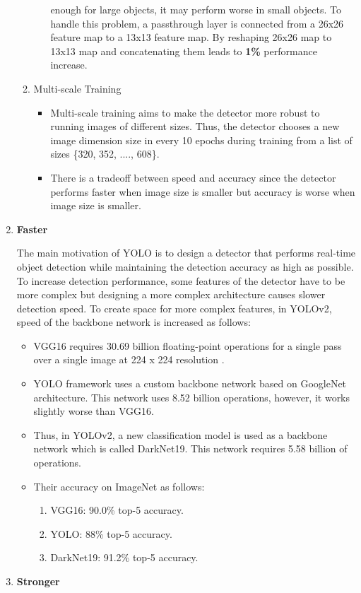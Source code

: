 \documentclass{article}
\begin{document}
\begin{enumerate}
\begin{enumerate}
\begin{itemize}
        enough for large objects, it may perform worse in small objects. To handle this problem, 
        a passthrough layer is connected from a 26x26 feature map to a 13x13 feature map. 
        By reshaping 26x26 map to 13x13 map and concatenating them leads to \textbf{1\%} performance increase. 
        \end{itemize}
        \item Multi-scale Training
        \begin{itemize}
            \item Multi-scale training aims to make the detector more robust 
            to running images of different sizes. Thus, the detector chooses a new 
            image dimension size in every 10 epochs during training from a list of 
            sizes \{320, 352, ...., 608\}.
            \item There is a tradeoff between speed and accuracy since the detector 
            performs faster when image size is smaller but accuracy is worse when 
            image size is smaller.
        \end{itemize}
    \end{enumerate}
    \item \textbf{Faster}

    The main motivation of YOLO is to design a detector that performs 
    real-time object detection while maintaining the detection accuracy as high 
    as possible. To increase detection performance, some features of the detector 
    have to be more complex but designing a more complex architecture causes 
    slower detection speed. To create space for more complex features, in 
    YOLOv2, speed of the backbone network is increased as follows:
    \begin{itemize}
        \item VGG16 requires 30.69 billion floating-point operations for a single 
        pass over a single image at 224 x 224 resolution \cite{yolo9000cite}.
        \item YOLO framework uses a custom backbone network based on GoogleNet 
        architecture. This network uses 8.52 billion operations, however, it works 
        slightly worse than VGG16.
        \item Thus, in YOLOv2, a new classification model is used as a backbone network 
        which is called DarkNet19. This network requires 5.58 billion of operations.
        \item Their accuracy on ImageNet as follows:
        \begin{enumerate}
            \item VGG16: 90.0\% top-5 accuracy.
            \item YOLO: 88\% top-5 accuracy.
            \item DarkNet19: 91.2\% top-5 accuracy.
        \end{enumerate}
    \end{itemize}
    \item \textbf{Stronger}
    

\end{enumerate}
\end{document}
